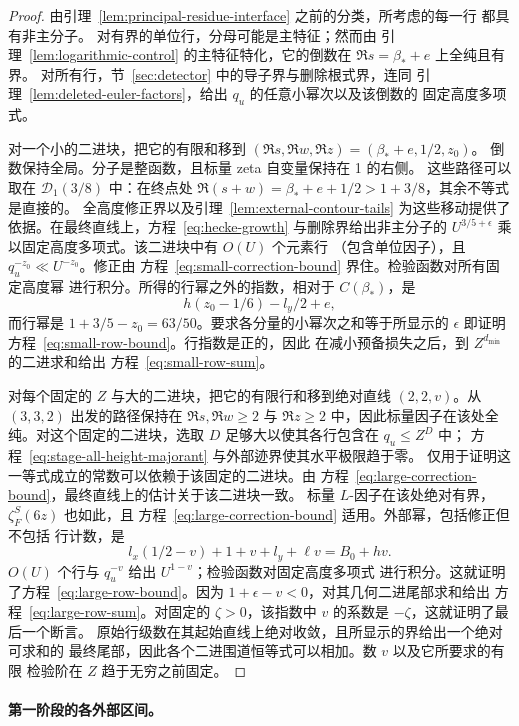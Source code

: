 \begin{proof}
由引理~\ref{lem:principal-residue-interface} 之前的分类，所考虑的每一行
都具有非主分子。
对有界的单位行，分母可能是主特征；然而由
引理~\ref{lem:logarithmic-control} 的主特征特化，它的倒数在
$\Re s=\beta_*+e$ 上全纯且有界。
对所有行，节~\ref{sec:detector} 中的导子界与删除根式界，连同
引理~\ref{lem:deleted-euler-factors}，给出 $q_u$ 的任意小幂次以及该倒数的
固定高度多项式。

对一个小的二进块，把它的有限和移到
$(\Re s,\Re w,\Re z)=(\beta_*+e,1/2,z_0)$。
倒数保持全局。分子是整函数，且标量 zeta 自变量保持在 1 的右侧。
这些路径可以取在 $\mathcal D_1(3/8)$ 中：在终点处
$\Re(s+w)=\beta_*+e+1/2>1+3/8$，其余不等式是直接的。
全高度修正界以及引理~\ref{lem:external-contour-tails} 为这些移动提供了
依据。在最终直线上，方程~\eqref{eq:hecke-growth} 与删除界给出非主分子的
$U^{3/5+\epsilon}$ 乘以固定高度多项式。该二进块中有 $O(U)$ 个元素行
（包含单位因子），且
$q_u^{-z_0}\ll U^{-z_0}$。修正由
方程~\eqref{eq:small-correction-bound} 界住。检验函数对所有固定高度幂
进行积分。所得的行幂之外的指数，相对于 $C(\beta_*)$，是
\[
 h(z_0-1/6)-l_y/2+e,
\]
而行幂是 $1+3/5-z_0=63/50$。要求各分量的小幂次之和等于所显示的
$\epsilon$ 即证明方程~\eqref{eq:small-row-bound}。行指数是正的，因此
在减小预备损失之后，到 $Z^{d_{\min}}$ 的二进求和给出
方程~\eqref{eq:small-row-sum}。

对每个固定的 $Z$ 与大的二进块，把它的有限行和移到绝对直线
$(2,2,v)$。从 $(3,3,2)$ 出发的路径保持在 $\Re s,\Re w\ge2$ 与
$\Re z\ge2$ 中，因此标量因子在该处全纯。对这个固定的二进块，选取
$D$ 足够大以使其各行包含在 $q_u\le Z^D$ 中；
方程~\eqref{eq:stage-all-height-majorant} 与外部迹界使其水平极限趋于零。
仅用于证明这一等式成立的常数可以依赖于该固定的二进块。由
方程~\eqref{eq:large-correction-bound}，最终直线上的估计关于该二进块一致。
标量 $L$-因子在该处绝对有界，$\zeta_F^S(6z)$ 也如此，且
方程~\eqref{eq:large-correction-bound} 适用。外部幂，包括修正但不包括
行计数，是
\[
 l_x(1/2-v)+1+v+l_y+\ell v=B_0+hv.
\]
$O(U)$ 个行与 $q_u^{-v}$ 给出 $U^{1-v}$；检验函数对固定高度多项式
进行积分。这就证明了方程~\eqref{eq:large-row-bound}。因为
$1+\epsilon-v<0$，对其几何二进尾部求和给出
方程~\eqref{eq:large-row-sum}。对固定的 $\zeta>0$，该指数中 $v$ 的系数是
$-\zeta$，这就证明了最后一个断言。
原始行级数在其起始直线上绝对收敛，且所显示的界给出一个绝对可求和的
最终尾部，因此各个二进围道恒等式可以相加。数 $v$ 以及它所要求的有限
检验阶在 $Z$ 趋于无穷之前固定。
\end{proof}

\paragraph{第一阶段的各外部区间。}

